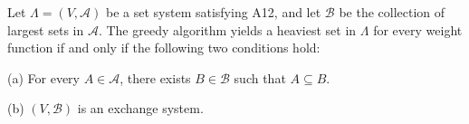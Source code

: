 Let $\Lambda = (V, \mathcal{A})$ be a set system satisfying A12, and let $\mathcal{B}$ be the collection of largest sets in $\mathcal{A}$. The greedy algorithm yields a heaviest set in $\Lambda$ for every weight function if and only if the following two conditions hold:

(a) For every $A \in \mathcal{A}$, there exists $B \in \mathcal{B}$ such that $A \subseteq B$.

(b) $(V, \mathcal{B})$ is an exchange system.
